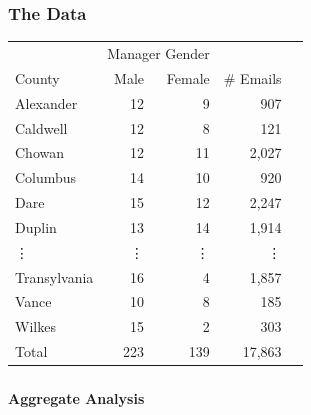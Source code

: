 \documentclass[xcolor={table}]{beamer}
\newenvironment{changemargin}[2]{%
  \begin{list}{}{%
    \setlength{\topsep}{0pt}%
    \setlength{\leftmargin}{#1}%
    \setlength{\rightmargin}{#2}%
    \setlength{\listparindent}{\parindent}%
    \setlength{\itemindent}{\parindent}%
    \setlength{\parsep}{\parskip}%
  }%
  \item[]}{\end{list}}
\begin{document}
\begin{frame}\frametitle{The Data}
	\Large
\begin{changemargin}{-1cm}{ -1cm}	
	  \centering
	  \vspace*{-.3in}
	  \centering
	  \begin{tabular}{lrrrr}
	    \toprule
	    & \multicolumn{2}{c}{Manager Gender} & \\
	    \cmidrule{2-3}
	    County & Male & Female & \# Emails  \\
	    \midrule
	    Alexander & 12 & 9 & 907   \\
	    Caldwell & 12 & 8 & 121     \\
	    Chowan & 12 & 11 & 2,027   \\
	    Columbus & 14 & 10 & 920   \\
	    Dare & 15 & 12 & 2,247    \\
	    Duplin & 13 & 14 & 1,914    \\
		\vdots & \vdots & \vdots & \vdots \\
	    Transylvania & 16 & 4 & 1,857  \\
	    Vance & 10 & 8 & 185   \\
	    Wilkes & 15 & 2 & 303   \\
	    \midrule
	    Total & 223 & 139 & 17,863 \\
	    \bottomrule
	  \end{tabular}

\end{changemargin}

\end{frame}

\begin{frame}\frametitle{}
	\begin{center}
		\Huge\textbf{Aggregate Analysis}
	\end{center}
\end{frame}
\end{document}
